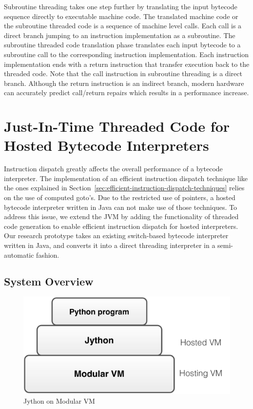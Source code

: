 Subroutine threading takes one step further by translating the input bytecode sequence directly to executable machine code.
The translated machine code or the subroutine threaded code is a sequence of machine level calls.
Each call is a direct branch jumping to an instruction implementation as a subroutine.
The subroutine threaded code translation phase translates each input bytecode to a subroutine call to the corresponding instruction implementation.
Each instruction implementation ends with a return instruction that transfer execution back to the threaded code.
Note that the call instruction in subroutine threading is a direct branch.
Although the return instruction is an indirect branch, modern hardware can accurately predict call/return repairs which results in a performance increase.

\section{Just-In-Time Threaded Code for Hosted Bytecode Interpreters}

Instruction dispatch greatly affects the overall performance of a bytecode interpreter.
The implementation of an efficient instruction dispatch technique like the ones explained in Section~\ref{sec:efficient-instruction-dispatch-techniques} relies on the use of computed goto's.
Due to the restricted use of pointers, a hosted bytecode interpreter written in Java can not make use of those techniques.
To address this issue, we extend the JVM by adding the functionality of threaded code generation to enable efficient instruction dispatch for hosted interpreters.
Our research prototype takes an existing switch-based bytecode interpreter written in Java, and converts it into a direct threading interpreter in a semi-automatic fashion.

\subsection{System Overview}
\label{sec:system-overview}

\begin{figure}[th]
\centering
\includegraphics[scale=.3]{figures/ch2-jython-on-modularvm.pdf}
\caption{Jython on Modular VM}
\label{fig:jython-on-modularvm}
\end{figure}

